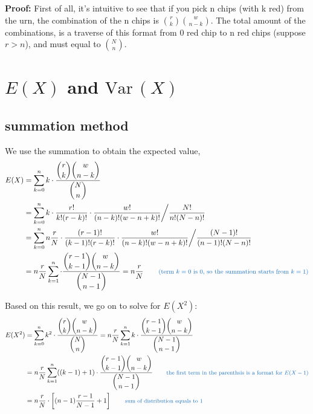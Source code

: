 \documentclass[11pt]{article}
\def\Var{{\textrm{Var}}\,}
\begin{document}
\textbf{Proof:} First of all,  it's intuitive to see that if you pick n chips (with k red) from the urn,  the combination of the n chips is $ \binom {r}{k} \binom {w}{n-k}$.  The total amount of the combinations,  is a traverse of this format from 0 red chip to n red chips (suppose $r>n$), and must equal to $ \binom {N}{n}$.   


\section{\normalsize $E(X)$ and $\Var (X)$}

\subsection{\small summation method}

We use the summation to obtain the expected value,
\[
\begin{aligned}
E(X) &= \sum _{k=0} ^n k \cdot \frac{\displaystyle  \binom {r}{k} \binom {w}{n-k}} {\displaystyle \binom {N}{n}} \\
&= \sum _{k=0} ^n k \cdot \frac{r!}{k!(r-k)!} \cdot \frac{w!}{(n-k)!(w-n+k)!} \bigg/ \frac{N!}{n!(N-n)!} \\
&= \sum _{k=0} ^n n \frac{r}{N} \cdot \frac{(r-1)!}{(k-1)!(r-k)!} \cdot \frac{w!}{(n-k)!(w-n+k)!} \bigg/ \frac{(N-1)!}{(n-1)!(N-n)!} \\
&=n \frac{r}{N}  \sum _{k=1} ^n \cdot \frac{\displaystyle  \binom {r-1}{k-1} \binom {w}{n-k}} {\displaystyle \binom {N-1}{n-1}} = n \frac{r}{N} \qquad \text{\color{RoyalBlue} \footnotesize (term $k=0$ is 0, so the summation starts from $k=1$)} 
\end{aligned}
\]

Based on this result, we go on to solve for $E(X^2)$:
\[
\begin{aligned}
E(X^2) &= \sum _{k=0} ^n k^2 \cdot \frac{\displaystyle  \binom {r}{k} \binom {w}{n-k}} {\displaystyle \binom {N}{n}} =n \frac{r}{N}  \sum _{k=1} ^n k \cdot \frac{\displaystyle  \binom {r-1}{k-1} \binom {w}{n-k}} {\displaystyle \binom {N-1}{n-1}} \\
&=  n \frac{r}{N}  \sum _{k=1} ^n ((k-1)+1) \cdot \frac{\displaystyle  \binom {r-1}{k-1} \binom {w}{n-k}} {\displaystyle \binom {N-1}{n-1}} \qquad \text{\color{RoyalBlue} \footnotesize the first term in the parenthsis is a format for $E(X-1)$} \\
&= n \frac{r}{N} \cdot \left[ (n-1) \frac{r-1}{N-1} +1 \right] \qquad \text{\color{RoyalBlue} \footnotesize sum of distribution equals to 1} \\
\end{aligned}
\]
\end{document}
